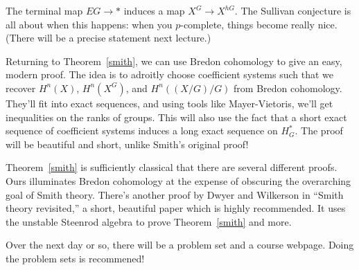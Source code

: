 The terminal map $EG\to *$ induces a map $X^G\to X^{hG}$. The Sullivan conjecture is all about when this happens:
when you $p$-complete, things become really nice. (There will be a precise statement next lecture.)

Returning to Theorem~\ref{smith}, we can use Bredon cohomology to give an easy, modern proof. The idea is to
adroitly choose coefficient systems such that we recover $H^n(X)$, $H^n(X^G)$, and $H^n((X/G)/G)$ from Bredon
cohomology. They'll fit into exact sequences, and using tools like Mayer-Vietoris, we'll get inequalities on the
ranks of groups. This will also use the fact that a short exact sequence of coefficient systems induces a long
exact sequence on $H_G^*$. The proof will be beautiful and short, unlike Smith's original proof!

Theorem~\ref{smith} is sufficiently classical that there are several different proofs. Ours illuminates Bredon
cohomology at the expense of obscuring the overarching goal of Smith theory. There's another proof by Dwyer and
Wilkerson in ``Smith theory revisited,'' a short, beautiful paper which is highly recommended. It uses the unstable
Steenrod algebra to prove Theorem~\ref{smith} and more. %

Over the next day or so, there will be a problem set and a course webpage. Doing the problem sets is recommened!
